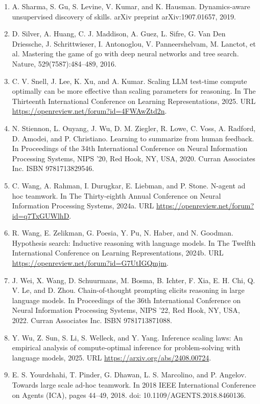 \documentclass[11pt,UTF8,fontset=fandol]{ctexart}
\begin{document}
\begin{enumerate}[leftmargin=2em,itemsep=2pt]
\item A. Sharma, S. Gu, S. Levine, V. Kumar, and K. Hausman. Dynamics-aware unsupervised discovery of skills. arXiv preprint arXiv:1907.01657, 2019.
\item D. Silver, A. Huang, C. J. Maddison, A. Guez, L. Sifre, G. Van Den Driessche, J. Schrittwieser, I. Antonoglou, V. Panneershelvam, M. Lanctot, et al. Mastering the game of go with deep neural networks and tree search. Nature, 529(7587):484--489, 2016.
\item C. V. Snell, J. Lee, K. Xu, and A. Kumar. Scaling LLM test-time compute optimally can be more effective than scaling parameters for reasoning. In The Thirteenth International Conference on Learning Representations, 2025. URL \url{https://openreview.net/forum?id=4FWAwZtd2n}.
\item N. Stiennon, L. Ouyang, J. Wu, D. M. Ziegler, R. Lowe, C. Voss, A. Radford, D. Amodei, and P. Christiano. Learning to summarize from human feedback. In Proceedings of the 34th International Conference on Neural Information Processing Systems, NIPS '20, Red Hook, NY, USA, 2020. Curran Associates Inc. ISBN 9781713829546.
\item C. Wang, A. Rahman, I. Durugkar, E. Liebman, and P. Stone. N-agent ad hoc teamwork. In The Thirty-eighth Annual Conference on Neural Information Processing Systems, 2024a. URL \url{https://openreview.net/forum?id=q7TxGUWlhD}.
\item R. Wang, E. Zelikman, G. Poesia, Y. Pu, N. Haber, and N. Goodman. Hypothesis search: Inductive reasoning with language models. In The Twelfth International Conference on Learning Representations, 2024b. URL \url{https://openreview.net/forum?id=G7UtIGQmjm}.
\item J. Wei, X. Wang, D. Schuurmans, M. Bosma, B. Ichter, F. Xia, E. H. Chi, Q. V. Le, and D. Zhou. Chain-of-thought prompting elicits reasoning in large language models. In Proceedings of the 36th International Conference on Neural Information Processing Systems, NIPS '22, Red Hook, NY, USA, 2022. Curran Associates Inc. ISBN 9781713871088.
\item Y. Wu, Z. Sun, S. Li, S. Welleck, and Y. Yang. Inference scaling laws: An empirical analysis of compute-optimal inference for problem-solving with language models, 2025. URL \url{https://arxiv.org/abs/2408.00724}.
\item E. S. Yourdshahi, T. Pinder, G. Dhawan, L. S. Marcolino, and P. Angelov. Towards large scale ad-hoc teamwork. In 2018 IEEE International Conference on Agents (ICA), pages 44--49, 2018. doi: 10.1109/AGENTS.2018.8460136.

\end{enumerate}
\end{document}
